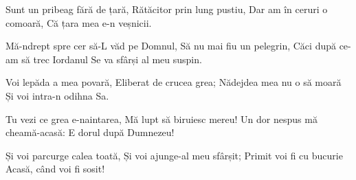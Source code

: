 \beginverse
Sunt un pribeag fără de țară,
Rătăcitor prin lung pustiu,
Dar am în ceruri o comoară,
Că țara mea e-n veșnicii.
\endverse

\beginchorus
Mă-ndrept spre cer să-L văd pe Domnul,
Să nu mai fiu un pelegrin,
Căci după ce-am să trec Iordanul
Se va sfârși al meu suspin.
\endchorus

\beginverse
Voi lepăda a mea povară,
Eliberat de crucea grea;
Nădejdea mea nu o să moară
Și voi intra-n odihna Sa.
\endverse

\beginverse
Tu vezi ce grea e-naintarea,
Mă lupt să biruiesc mereu!
Un dor nespus mă cheamă-acasă:
E dorul după Dumnezeu!
\endverse

\beginverse
Și voi parcurge calea toată,
Și voi ajunge-al meu sfârșit;
Primit voi fi cu bucurie
Acasă, când voi fi sosit!
\endverse
\endsong
